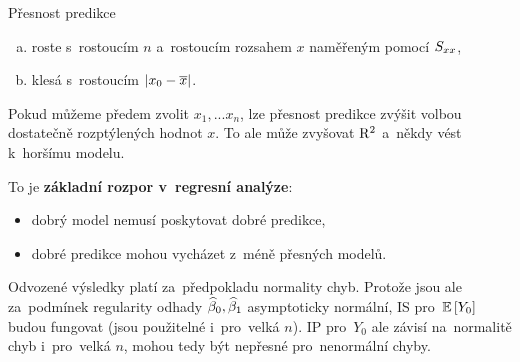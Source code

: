 \begin{remark}
	Přesnost predikce \begin{enumerate}[a)]
		\item roste s~rostoucím $n$ a~rostoucím rozsahem $x$ naměřeným pomocí $S_{xx}$,
		\item klesá s~rostoucím $|x_0-\overline{x}|$.
	\end{enumerate}
Pokud můžeme předem zvolit $x_1,... x_n$, lze přesnost predikce zvýšit volbou dostatečně rozptýlených hodnot $x$. To ale může zvyšovat $\mathrm{R}^2$ a~někdy vést k~horšímu modelu.

To je \textbf{základní rozpor v~regresní analýze}:
\begin{itemize}
	\item dobrý model nemusí poskytovat dobré predikce,
	\item dobré predikce mohou vycházet z~méně přesných modelů.
\end{itemize}
\end{remark}
\begin{remark}
	Odvozené výsledky platí za~předpokladu normality chyb. Protože jsou ale za~podmínek regularity odhady $\widehat{\beta}_0,\widehat{\beta}_1$ asymptoticky normální, IS pro~$\mathbb{E}\left[ Y_0 \right]$ budou fungovat (jsou použitelné i~pro~velká $n$). IP pro~$Y_0$ ale závisí na~normalitě  chyb i~pro~velká $n$, mohou tedy být nepřesné pro~nenormální chyby.
\end{remark}
